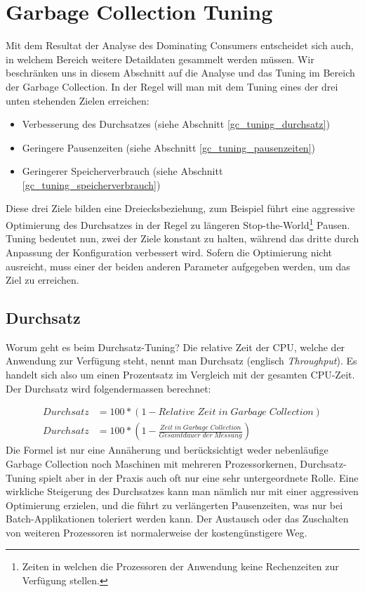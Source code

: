\section{Garbage Collection Tuning}\label{garbage_collection_tuning}
Mit dem Resultat der Analyse des Dominating Consumers entscheidet sich auch, in welchem Bereich weitere Detaildaten gesammelt werden müssen. Wir beschränken uns in diesem Abschnitt auf die Analyse und das Tuning im Bereich der Garbage Collection. In der Regel will man mit dem Tuning eines der drei unten stehenden Zielen erreichen\cite{langerkreftJavaCore}: 
\begin{itemize}
\item Verbesserung des Durchsatzes (siehe Abschnitt \ref{gc_tuning_durchsatz})
\item Geringere Pausenzeiten (siehe Abschnitt \ref{gc_tuning_pausenzeiten})
\item Geringerer Speicherverbrauch (siehe Abschnitt \ref{gc_tuning_speicherverbrauch})
\end{itemize}

Diese drei Ziele bilden eine Dreiecksbeziehung, zum Beispiel führt eine aggressive Optimierung des Durchsatzes in der Regel zu längeren Stop-the-World\footnote{Zeiten in welchen die Prozessoren der Anwendung keine Rechenzeiten zur Verfügung stellen.} Pausen. Tuning bedeutet nun, zwei der Ziele konstant zu halten, während das dritte durch Anpassung der Konfiguration verbessert wird. Sofern die Optimierung nicht ausreicht, muss einer der beiden anderen Parameter aufgegeben werden, um das Ziel zu erreichen.


\subsection{Durchsatz\label{gc_tuning_durchsatz}}
Worum geht es beim Durchsatz-Tuning? Die relative Zeit der CPU, welche der Anwendung zur Verfügung steht, nennt man Durchsatz (englisch \textit{Throughput}). Es handelt sich also um einen Prozentsatz im Vergleich mit der gesamten CPU-Zeit. Der Durchsatz wird folgendermassen berechnet:

 \begin{align*}
         Durchsatz &= 100 * (1-Relative\;Zeit\;in\;Garbage\;Collection)\\
         Durchsatz &= 100 * (1-\frac{Zeit\;in\;Garbage\;Collection}{Gesamtdauer\;der\;Messung})
 \end{align*}
Die Formel ist nur eine Annäherung und berücksichtigt weder nebenläufige Garbage Collection noch Maschinen mit mehreren Prozessorkernen, Durchsatz-Tuning spielt aber in der Praxis auch oft nur eine sehr untergeordnete Rolle\cite{langerkreftJavaCore}. Eine wirkliche Steigerung des Durchsatzes kann man nämlich nur mit einer aggressiven Optimierung erzielen, und die führt zu verlängerten Pausenzeiten, was nur bei Batch-Applikationen toleriert werden kann. Der Austausch oder das Zuschalten von weiteren Prozessoren ist normalerweise der kostengünstigere Weg.

